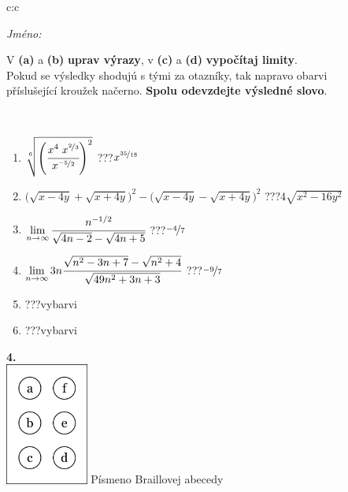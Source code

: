 \documentclass[10pt]{report}
\begin{document}
\begin{tabular}{c:c}
\begin{minipage}[c][104.5mm][t]{0.5\linewidth}
\begin{center}
\textit{Jméno:}\phantom{xxxxxxxxxxxxxxxxxxxxxxxxxxxxxxxxxxxxxxxxxxxxxxxxxxxxxxxxxxxxxxxxx}\\[5mm]
\begin{minipage}{0.95\linewidth}
\begin{center}
V \textbf{(a)} a \textbf{(b)} \textbf{uprav výrazy}, v \textbf{(c)} a \textbf{(d)} \textbf{vypočítaj limity}.\\Pokud se výsledky shodujú s tými za otazníky, tak napravo obarvi\\příslušející kroužek načerno. \textbf{Spolu odevzdejte výsledné slovo}.
\end{center}
\end{minipage}
\\[1mm]
\begin{minipage}{0.79\linewidth}
\begin{center}
\begin{varwidth}{\linewidth}
\begin{enumerate}
\small
\item $\sqrt[6]{\left(\cfrac{x^{4}\;x^{\nicefrac{2}{3}}}{x^{\nicefrac{-5}{2}}}\right)^{2}}$\quad \dotfill\; ???\;\dotfill \quad $x^{\nicefrac{35}{18}}$
\item {\footnotesize{\scriptsize$\big(\sqrt{x-4y}+\sqrt{x+4y}\big)^2-\big(\sqrt{x-4y}-\sqrt{x+4y}\big)^2$}\quad \dotfill\; ???\;\dotfill \quad $4\sqrt{x^2-16y^2}$}
\item $\lim\limits_{n\to\infty}\cfrac{n^{-1/2}}{\sqrt{4n-2}-\sqrt{4n+5}}$\quad \dotfill\; ???\;\dotfill \quad $\nicefrac{-4}{7}$
\item $\lim\limits_{n\to\infty}3n\cfrac{\sqrt{n^2-3n+7}-\sqrt{n^2+4}}{\sqrt{49n^2+3n+3}}$\quad \dotfill\; ???\;\dotfill \quad $\nicefrac{-9}{7}$
\item \quad \dotfill\; ???\;\dotfill \quad vybarvi
\item \quad \dotfill\; ???\;\dotfill \quad vybarvi
\end{enumerate}
\end{varwidth}
\end{center}
\end{minipage}
\begin{minipage}{0.20\linewidth}
\begin{center}
{\Huge\bfseries 4.} \\[2mm]
\includegraphics[height=40mm]{../images/braille.png}
{\small Písmeno Braillovej abecedy}
\end{center}
\end{minipage}
\end{center}
\end{minipage}
%
\end{tabular}
\end{document}
